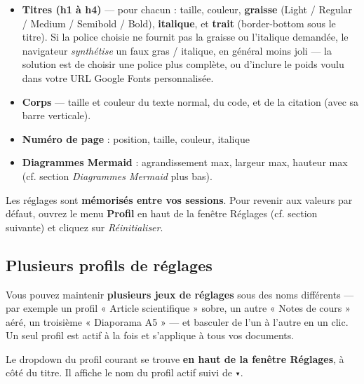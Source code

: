 \documentclass[11pt,a4paper]{article}
\theoremstyle{definition}
\begin{document}
\begin{itemize}
\begin{itemize}
  \item \emph{Au-dessus / en dessous des titres} (\texttt{1.6} / \texttt{0.6} par défaut) :
l'espace au-dessus d'un titre de taille T est \texttt{ratio × T}.
Asymétrique exprès — plus d'air au-dessus, pour que le titre
« appartienne » à la section qui suit.
  \item \emph{Entre paragraphes} (\texttt{1.0} par défaut) : marge symétrique
appliquée à chaque paragraphe.
\end{itemize}
  \item \textbf{Titres (h1 à h4)} — pour chacun : taille, couleur, \textbf{graisse}
(Light / Regular / Medium / Semibold / Bold), \textbf{italique}, et
\textbf{trait} (border-bottom sous le titre). Si la police choisie ne
fournit pas la graisse ou l'italique demandée, le navigateur
\emph{synthétise} un faux gras / italique, en général moins joli — la
solution est de choisir une police plus complète, ou d'inclure
le poids voulu dans votre URL Google Fonts personnalisée.
  \item \textbf{Corps} — taille et couleur du texte normal, du code, et de la
citation (avec sa barre verticale).
  \item \textbf{Numéro de page} : position, taille, couleur, italique
  \item \textbf{Diagrammes Mermaid} : agrandissement max, largeur max,
hauteur max (cf. section \emph{Diagrammes Mermaid} plus bas).
\end{itemize}


Les réglages sont \textbf{mémorisés entre vos sessions}. Pour revenir aux
valeurs par défaut, ouvrez le menu \textbf{Profil} en haut de la fenêtre
Réglages (cf. section suivante) et cliquez sur \emph{Réinitialiser}.


\subsection{Plusieurs profils de réglages}

Vous pouvez maintenir \textbf{plusieurs jeux de réglages} sous des noms
différents — par exemple un profil « Article scientifique » sobre, un
autre « Notes de cours » aéré, un troisième « Diaporama A5 » — et
basculer de l'un à l'autre en un clic. Un seul profil est actif à la
fois et s'applique à tous vos documents.


Le dropdown du profil courant se trouve \textbf{en haut de la fenêtre
Réglages}, à côté du titre. Il affiche le nom du profil actif suivi
de \texttt{▾}.
\end{document}
